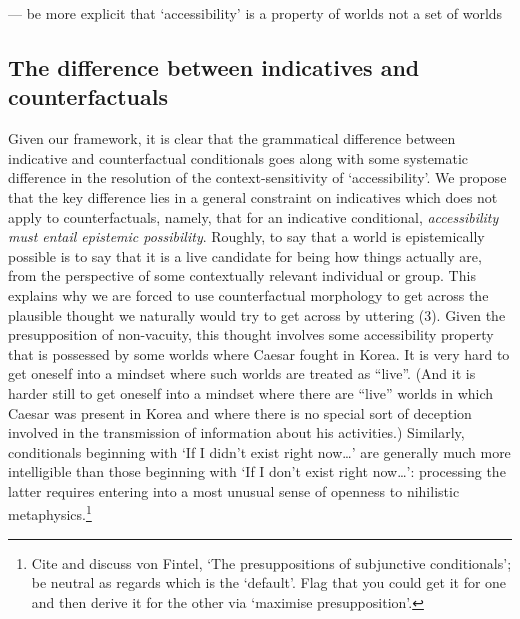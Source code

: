 --- be more explicit that `accessibility' is a property of worlds not a
set of worlds

\subsection{The difference between indicatives and
counterfactuals}\label{the-difference-between-indicatives-and-counterfactuals}

Given our framework, it is clear that the grammatical difference between
indicative and counterfactual conditionals goes along with some
systematic difference in the resolution of the context-sensitivity of
`accessibility'. We propose that the key difference lies in a general
constraint on indicatives which does not apply to counterfactuals,
namely, that for an indicative conditional, \emph{accessibility must
entail epistemic possibility}. Roughly, to say that a world is
epistemically possible is to say that it is a live candidate for being
how things actually are, from the perspective of some contextually
relevant individual or group. This explains why we are forced to use
counterfactual morphology to get across the plausible thought we
naturally would try to get across by uttering (3). Given the
presupposition of non-vacuity, this thought involves some accessibility
property that is possessed by some worlds where Caesar fought in Korea.
It is very hard to get oneself into a mindset where such worlds are
treated as ``live''. (And it is harder still to get oneself into a
mindset where there are ``live'' worlds in which Caesar was present in
Korea and where there is no special sort of deception involved in the
transmission of information about his activities.) Similarly,
conditionals beginning with `If I didn't exist right now\ldots{}' are
generally much more intelligible than those beginning with `If I don't
exist right now\ldots{}': processing the latter requires entering into a
most unusual sense of openness to nihilistic metaphysics.\footnote{Cite
  and discuss von Fintel, `The presuppositions of subjunctive
  conditionals'; be neutral as regards which is the `default'. Flag that
  you could get it for one and then derive it for the other via
  `maximise presupposition'.}

